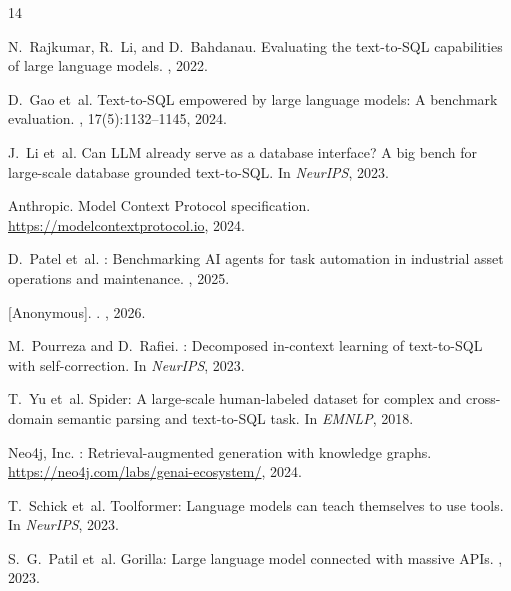 \documentclass[sigconf, anonymous, review]{acmart}
\begin{document}

\begin{thebibliography}{14}

N.~Rajkumar, R.~Li, and D.~Bahdanau.
\newblock Evaluating the text-to-SQL capabilities of large language models.
, 2022.

D.~Gao et~al.
\newblock Text-to-SQL empowered by large language models: A benchmark evaluation.
, 17(5):1132--1145, 2024.

J.~Li et~al.
\newblock Can LLM already serve as a database interface? A big bench for
  large-scale database grounded text-to-SQL.
\newblock In {\em NeurIPS}, 2023.

Anthropic.
\newblock Model {Context Protocol} specification.
\newblock \url{https://modelcontextprotocol.io}, 2024.

D.~Patel et~al.
: Benchmarking {AI} agents for task automation in
  industrial asset operations and maintenance.
, 2025.

[Anonymous].
.
, 2026.

M.~Pourreza and D.~Rafiei.
: Decomposed in-context learning of text-to-SQL with
  self-correction.
\newblock In {\em NeurIPS}, 2023.

T.~Yu et~al.
\newblock Spider: A large-scale human-labeled dataset for complex and
  cross-domain semantic parsing and text-to-SQL task.
\newblock In {\em EMNLP}, 2018.

Neo4j, Inc.
: Retrieval-augmented generation with knowledge graphs.
\newblock \url{https://neo4j.com/labs/genai-ecosystem/}, 2024.

T.~Schick et~al.
\newblock Toolformer: Language models can teach themselves to use tools.
\newblock In {\em NeurIPS}, 2023.

S.~G.~Patil et~al.
\newblock Gorilla: Large language model connected with massive APIs.
, 2023.


\end{thebibliography}
\end{document}
